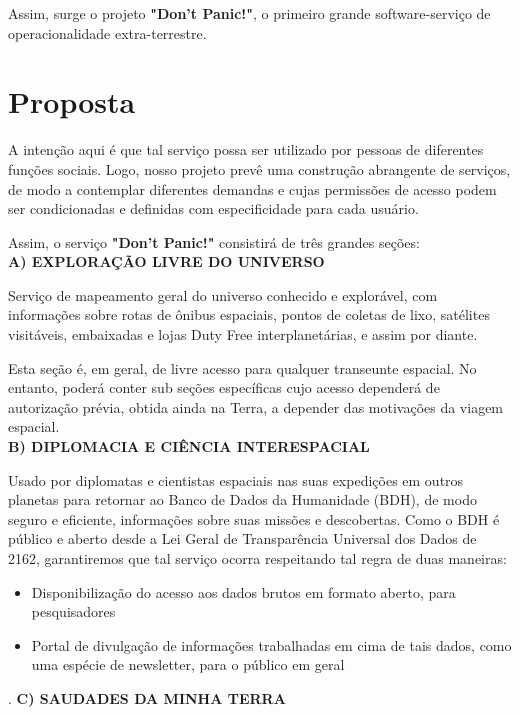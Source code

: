 \documentclass[12pt]{exam}
\begin{document}
    Assim, surge o projeto \textbf{"Don't Panic!"}, o primeiro grande software-serviço de operacionalidade extra-terrestre. 
        
\section{Proposta}

        A intenção aqui é que tal serviço possa ser utilizado por pessoas de diferentes funções sociais. Logo, nosso projeto prevê uma construção abrangente de serviços, de modo a contemplar diferentes demandas e cujas permissões de acesso podem ser condicionadas e definidas com especificidade para cada usuário. 
        
        Assim, o serviço \textbf{"Don't Panic!"} consistirá de três grandes seções: \\
        
    \textbf{A) EXPLORAÇÃO LIVRE DO UNIVERSO} 
    
    Serviço de mapeamento geral do universo conhecido e explorável, com informações sobre rotas de ônibus espaciais, pontos de coletas de lixo, satélites visitáveis, embaixadas e lojas Duty Free interplanetárias, e assim por diante. 
    
        Esta seção é, em geral, de livre acesso para qualquer transeunte espacial. No entanto, poderá conter sub seções específicas cujo acesso dependerá de autorização prévia, obtida ainda na Terra, a depender das motivações da viagem espacial.\\
    
    \textbf{B) DIPLOMACIA E CIÊNCIA INTERESPACIAL}
    
    Usado por diplomatas e cientistas espaciais nas suas expedições em outros planetas para retornar ao Banco de Dados da Humanidade (BDH), de modo seguro e eficiente, informações sobre suas missões e descobertas. Como o BDH é público e aberto desde a Lei Geral de Transparência Universal dos Dados de 2162, garantiremos que tal serviço ocorra respeitando tal regra de duas maneiras: 
        
        \begin{itemize}
        \item {Disponibilização do acesso aos dados brutos em formato aberto, para pesquisadores}
        \item {Portal de divulgação de informações trabalhadas em cima de tais dados, como uma espécie de newsletter, para o público em geral}
        \end{itemize}
.
        \textbf{C) SAUDADES DA MINHA TERRA}
    
\end{document}
